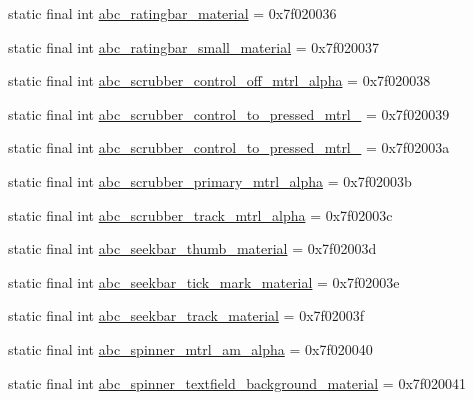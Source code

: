 \begin{CompactItemize}
static final int \hyperlink{classandroid_1_1support_1_1v7_1_1recyclerview_1_1_r_1_1drawable_c1efab98bbb0ba192c04319b00907db4}{abc\_\-ratingbar\_\-material} = 0x7f020036
\item 
static final int \hyperlink{classandroid_1_1support_1_1v7_1_1recyclerview_1_1_r_1_1drawable_63740b61c5634a7f5d136e054275e18d}{abc\_\-ratingbar\_\-small\_\-material} = 0x7f020037
\item 
static final int \hyperlink{classandroid_1_1support_1_1v7_1_1recyclerview_1_1_r_1_1drawable_f9dbe20d021508553aeb119b92be1338}{abc\_\-scrubber\_\-control\_\-off\_\-mtrl\_\-alpha} = 0x7f020038
\item 
static final int \hyperlink{classandroid_1_1support_1_1v7_1_1recyclerview_1_1_r_1_1drawable_ad71b0447e8a0086b2f4721a7fe95409}{abc\_\-scrubber\_\-control\_\-to\_\-pressed\_\-mtrl\_} = 0x7f020039
\item 
static final int \hyperlink{classandroid_1_1support_1_1v7_1_1recyclerview_1_1_r_1_1drawable_a515d38556c5e4d9eda580718483a908}{abc\_\-scrubber\_\-control\_\-to\_\-pressed\_\-mtrl\_} = 0x7f02003a
\item 
static final int \hyperlink{classandroid_1_1support_1_1v7_1_1recyclerview_1_1_r_1_1drawable_4938c00d2d83d93880eeec3d4abb28d1}{abc\_\-scrubber\_\-primary\_\-mtrl\_\-alpha} = 0x7f02003b
\item 
static final int \hyperlink{classandroid_1_1support_1_1v7_1_1recyclerview_1_1_r_1_1drawable_68eecded51774d4d45f8ac2441441b7c}{abc\_\-scrubber\_\-track\_\-mtrl\_\-alpha} = 0x7f02003c
\item 
static final int \hyperlink{classandroid_1_1support_1_1v7_1_1recyclerview_1_1_r_1_1drawable_9e7a0e7b54ac8882b3f771bf35be3939}{abc\_\-seekbar\_\-thumb\_\-material} = 0x7f02003d
\item 
static final int \hyperlink{classandroid_1_1support_1_1v7_1_1recyclerview_1_1_r_1_1drawable_9f98a4af5696e0e920915de5dda796f2}{abc\_\-seekbar\_\-tick\_\-mark\_\-material} = 0x7f02003e
\item 
static final int \hyperlink{classandroid_1_1support_1_1v7_1_1recyclerview_1_1_r_1_1drawable_8cc269d219c0ff0378b225011da43a09}{abc\_\-seekbar\_\-track\_\-material} = 0x7f02003f
\item 
static final int \hyperlink{classandroid_1_1support_1_1v7_1_1recyclerview_1_1_r_1_1drawable_7f00eb9cd33865317577285e8d269d85}{abc\_\-spinner\_\-mtrl\_\-am\_\-alpha} = 0x7f020040
\item 
static final int \hyperlink{classandroid_1_1support_1_1v7_1_1recyclerview_1_1_r_1_1drawable_bcb0d5580de65f83fae84d4ae75dcd97}{abc\_\-spinner\_\-textfield\_\-background\_\-material} = 0x7f020041

\end{CompactItemize}
